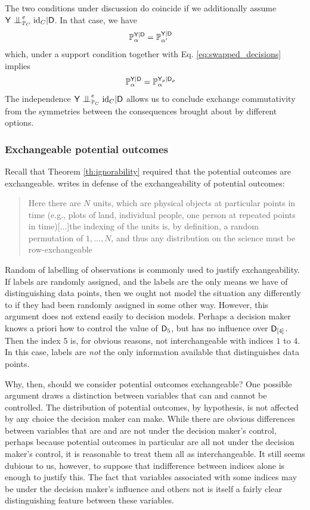 The two conditions under discussion do coincide if we additionally assume $\RV{Y}\CI^e_{\prob{P}_C} \text{id}_C |\RV{D}$. In that case, we have
\begin{align}
    \mathbb{P}_\alpha^{\mathsf{Y}|\mathsf{D}} &= \mathbb{P}_{\alpha'}^{\mathsf{Y}|\mathsf{D}}
\end{align}
which, under a support condition together with Eq. \eqref{eq:swapped_decisions} implies
\begin{align}
    \mathbb{P}_\alpha^{\mathsf{Y}|\mathsf{D}} &= \mathbb{P}_{\alpha}^{\mathsf{Y}_\rho|\mathsf{D}_\rho}
\end{align}
The independence $\RV{Y}\CI^e_{\prob{P}_C} \text{id}_C |\RV{D}$ allows us to conclude exchange commutativity from the symmetries between the consequences brought about by different options.

\subsubsection{Exchangeable potential outcomes}\label{sec:exch_po}

Recall that Theorem \ref{th:ignorability} required that the potential outcomes are exchangeable. \citet{rubin_causal_2005} writes in defense of the exchangeability of potential outcomes:
\begin{quote}
    Here there are $N$ units, which are physical objects at particular points in time (e.g., plots of land, individual people, one person at repeated points in time)[...]the indexing of the units is, by definition, a random permutation of $1,..., N$, and thus any distribution on the science must be row-exchangeable
\end{quote}

Random of labelling of observations is commonly used to justify exchangeability. If labels are randomly assigned, and the labels are the only means we have of distinguishing data points, then we ought not model the situation any differently to if they had been randomly assigned in some other way. However, this argument does not extend easily to decision models. Perhaps a decision maker knows a priori how to control the value of $\mathsf{D}_5$, but has no influence over $\mathsf{D}_{[4]}$. Then the index $5$ is, for obvious reasons, not interchangeable with indices $1$ to $4$. In this case, labels are \emph{not} the only information available that distinguishes data points.

Why, then, should we consider potential outcomes exchangeable? One possible argument draws a distinction between variables that can and cannot be controlled. The distribution of potential outcomes, by hypothesis, is not affected by any choice the decision maker can make. While there are obvious differences between variables that are and are not under the decision maker's control, perhaps because potential outcomes in particular are all not under the decision maker's control, it is reasonable to treat them all as interchangeable. It still seems dubious to us, however, to suppose that indifference between indices alone is enough to justify this. The fact that variables associated with some indices may be under the decision maker's influence and others not is itself a fairly clear distinguishing feature between these variables.

